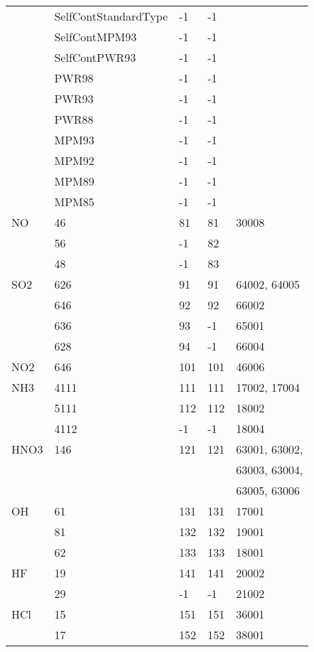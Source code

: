 \begin{longtable}{lllll}
    &SelfContStandardType&   -1        &-1&     \\
    &SelfContMPM93&          -1        &-1&     \\
    &SelfContPWR93&          -1        &-1&     \\
    &PWR98&                  -1        &-1&     \\ 
    &PWR93&                  -1        &-1&     \\
    &PWR88&                  -1        &-1&     \\  
    &MPM93&                  -1        &-1&     \\
    &MPM92&                  -1        &-1&     \\
    &MPM89&                  -1        &-1&     \\
    &MPM85&                  -1        &-1&     \\
\hline                  
  NO& 46&  81&    81&  30008\\
    & 56&  -1&    82&\\
    & 48&  -1&    83&\\
\hline                  
  SO2& 626&  91&    91&  64002, 64005\\
     & 646&  92&    92&  66002\\
     & 636&  93&    -1&  65001\\
     & 628&  94&    -1&  66004\\
\hline                  
  NO2& 646&  101&   101&  46006\\
\hline                  
  NH3& 4111&  111&   111&  17002, 17004\\
     & 5111&  112&   112&  18002\\
     & 4112&  -1&    -1&  18004\\
\hline                  
  HNO3& 146&  121&   121&  63001, 63002,\\
      &    &     &      &  63003, 63004,\\
      &    &     &      &  63005, 63006\\
\hline                  
  OH& 61&  131&   131&  17001\\
    & 81&  132&   132&  19001\\
    & 62&  133&   133&  18001\\
\hline                  
  HF& 19&  141&   141&  20002\\
    & 29&  -1&    -1&  21002\\
\hline                  
  HCl&15&  151&   151&  36001\\
     &17&  152&   152&  38001\\

\end{longtable}
